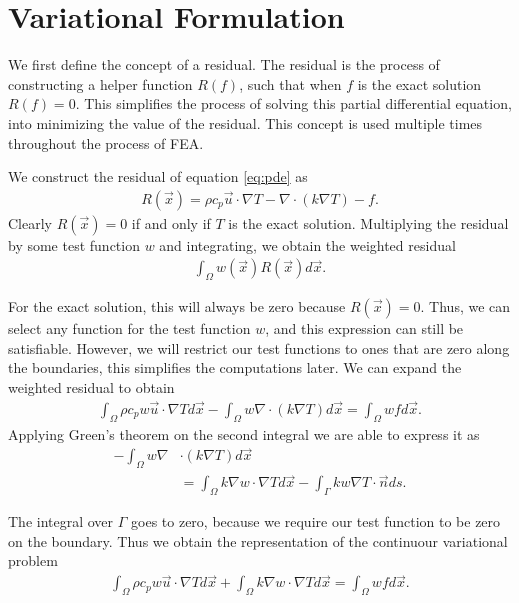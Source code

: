 \documentclass[../fem.tex]{subfiles}
\begin{document}
\section{Variational Formulation}%
\label{sec:variational_formulation}

We first define the concept of a residual. The residual is the process of
constructing a helper function $R(f)$, such that when $f$ is the exact solution
$R(f)=0$. This simplifies the process of solving this partial differential
equation, into minimizing the value of the residual. This concept is used
multiple times throughout the process of FEA.

We construct the residual of equation \ref{eq:pde} as
\begin{align*}
  R(\vec{x})=\rho c_p\vec{u}\cdot\nabla T-\nabla\cdot(k\nabla T)-f.
\end{align*}
Clearly $R(\vec{x})=0$ if and only if $T$ is the exact solution. Multiplying
the residual by some test function $w$ and integrating, we obtain the weighted
residual
\begin{align*}
  \int_\Omega w(\vec{x})R(\vec{x})d\vec{x}.
\end{align*}

For the exact solution, this will always be zero because $R(\vec{x})=0$. Thus,
we can select any function for the test function $w$, and this expression can
still be satisfiable. However, we will restrict our test functions to ones that
are zero along the boundaries, this simplifies the computations later. We can
expand the weighted residual to obtain
\begin{align}\label{eq:weight_res}
  \int_\Omega\rho c_p w\vec{u}\cdot\nabla T d\vec{x} - \int_\Omega
  w\nabla\cdot(k\nabla T)d\vec{x}=\int_\Omega wf d\vec{x}.
\end{align}
Applying Green's theorem on the second integral we are able to express it as
\begin{align*}
  -\int_\Omega w\nabla&\cdot(k\nabla T)d\vec{x}\\
  &=\int_\Omega k\nabla w\cdot \nabla T d\vec{x} - \int_\Gamma kw\nabla T\cdot \vec{n}ds.
\end{align*}

The integral over $\Gamma$ goes to zero, because we require our test function
to be zero on the boundary. Thus we obtain the representation of the continuour
variational problem
\begin{align}\label{eq:cvp}
  \int_\Omega \rho c_p w \vec{u}\cdot\nabla Td\vec{x}+\int_\Omega k\nabla
  w\cdot\nabla Td\vec{x}=\int_\Omega wfd\vec{x}.
\end{align}
\end{document}
